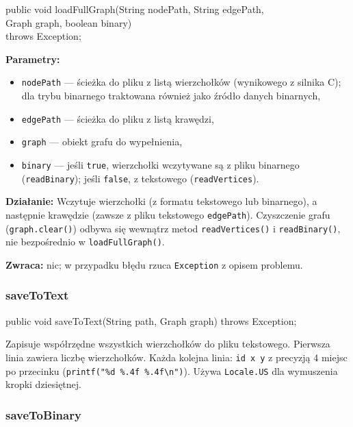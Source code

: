 \documentclass[a4paper, 11pt]{article}
\begin{document}
\begin{cmdbox}
public void loadFullGraph(String nodePath, String edgePath,\\
\quad\qquad\qquad\qquad\quad\; Graph graph, boolean binary)\\
\quad\qquad\qquad\qquad\quad\; throws Exception;
\end{cmdbox}

\textbf{Parametry:}
\begin{itemize}
  \item \texttt{nodePath} --- ścieżka do pliku z listą wierzchołków
    (wynikowego z silnika C); dla trybu binarnego traktowana również
    jako źródło danych binarnych,
  \item \texttt{edgePath} --- ścieżka do pliku z listą krawędzi,
  \item \texttt{graph} --- obiekt grafu do wypełnienia,
  \item \texttt{binary} --- jeśli \texttt{true}, wierzchołki wczytywane
    są z pliku binarnego (\texttt{readBinary}); jeśli \texttt{false},
    z tekstowego (\texttt{readVertices}).
\end{itemize}

\textbf{Działanie:} Wczytuje wierzchołki (z formatu tekstowego lub
binarnego), a następnie krawędzie (zawsze z pliku tekstowego
\texttt{edgePath}). Czyszczenie grafu (\texttt{graph.clear()}) odbywa się wewnątrz metod \texttt{readVertices()} i \texttt{readBinary()}, nie bezpośrednio w \texttt{loadFullGraph()}.

\textbf{Zwraca:} nic; w przypadku błędu rzuca \texttt{Exception}
z opisem problemu.

\subsubsection{saveToText}

\begin{cmdbox}
public void saveToText(String path, Graph graph) throws Exception;
\end{cmdbox}

Zapisuje współrzędne wszystkich wierzchołków do pliku tekstowego.
Pierwsza linia zawiera liczbę wierzchołków. Każda kolejna linia:
\texttt{id x y} z precyzją 4 miejsc po przecinku
(\texttt{printf("\%d \%.4f \%.4f\textbackslash n")}). Używa \texttt{Locale.US}
dla wymuszenia kropki dziesiętnej.

\subsubsection{saveToBinary}
\end{document}
